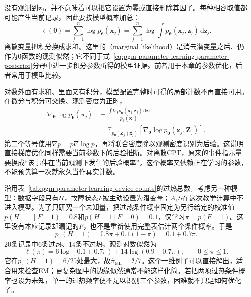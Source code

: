 没有观测到$\bm{z}_j$，并不意味着可以把它设置为零或直接删除其因子。每种相容取值都可能产生当前记录，因此要按模型概率加总：
\begin{equation}
  \ell(\bm{\theta})
    =\sum_{j=1}^n\log p_{\bm{\theta}}(\bm{x}_j)
    =\sum_{j=1}^n
       \log\int p_{\bm{\theta}}(\bm{x}_j,\bm{z}_j)
                         \,\mathrm{d}\bm{z}_j.
  \label{eq:pgm-parameter-learning-observed-likelihood}
\end{equation}
离散变量把积分换成求和。这里的（marginal likelihood）是消去潜变量之后、仍作为$\bm{\theta}$函数的观测似然；它不同于式~\eqref{eq:pgm-parameter-learning-parameter-posterior}分母中进一步积分参数所得的模型证据。前者用于本章的参数优化，后者常用于模型比较。

对数外面有求和、里面又有积分，模型配置完整时可得的局部计数不再直接可用。在微分与积分可交换、观测密度为正时，
\begin{equation}
  \begin{aligned}
    \nabla_{\bm{\theta}}\log p_{\bm{\theta}}(\bm{x}_j)
      &=\frac{\int\nabla_{\bm{\theta}}
          p_{\bm{\theta}}(\bm{x}_j,\bm{z}_j)
                  \,\mathrm{d}\bm{z}_j}
             {p_{\bm{\theta}}(\bm{x}_j)}\\
      &=\mathbb{E}_{p_{\bm{\theta}}(\bm{Z}_j\mid\bm{x}_j)}
          [\nabla_{\bm{\theta}}
            \log p_{\bm{\theta}}(\bm{x}_j,\bm{Z}_j)].
  \end{aligned}
  \label{eq:pgm-parameter-learning-fisher-identity}
\end{equation}
第二个等号使用$\nabla p=p\nabla\log p$，再将联合密度除以观测密度识别为后验。这说明直接梯度优化同样需要当前参数下的后验推断。对离散CPT，原来的事件指示量要换成“该事件在当前观测下发生的后验概率”。这个概率又依赖正在学习的参数，不能预先算一次就永久当作真实计数。

沿用表~\ref{tab:pgm-parameter-learning-device-counts}的过热总数，考虑另一种模型：数据字段只有$H$，故障状态$F$被主动设置为潜变量；$A,S$在这次教学计算中不进入模型。为了只研究一个未知量，把过热条件概率固定为另行给定的校准值$p(H=1\mid F=1)=0.8$和$p(H=1\mid F=0)=0.1$，仅学习$\pi=p(F=1)$。这里没有本应记录却漏记的$F$，也不是重新使用完整表估计两个条件概率。于是
\[
  p_\pi(H=1)=0.8\pi+0.1(1-\pi)=0.1+0.7\pi.
\]
$20$条记录中$6$条过热、$14$条不过热，观测对数似然为
\begin{equation}
  \ell(\pi)=6\log(0.1+0.7\pi)
             +14\log(0.9-0.7\pi),\qquad 0\leq\pi\leq1.
  \label{eq:pgm-parameter-learning-device-observed}
\end{equation}
它在$p_\pi(H=1)=6/20$处最大，故$\widehat\pi_{\mathrm{ML}}=2/7$。这个一维例子可以直接解出，适合用来检查EM；更复杂图中的边缘似然通常不能这样化简。若把两项过热条件概率也设为未知，单一的过热频率便不足以识别三个参数，困难就不只是如何优化了。

